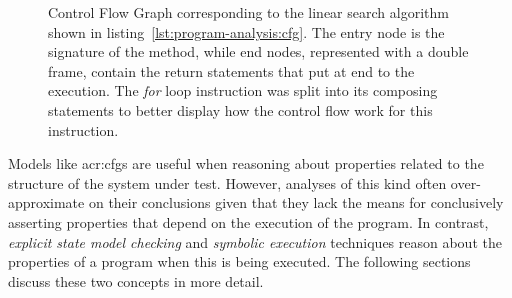 \begin{figure}[t]
\centering
{}
\caption[Control Flow Graph of Linear Search Algorithm]{Control Flow Graph corresponding to the linear search algorithm shown in listing~\ref{lst:program-analysis:cfg}. The entry node is the signature of the method, while end nodes, represented with a double frame, contain the return statements that put at end to the execution. The \textit{for} loop instruction was split into its composing statements to better display how the control flow work for this instruction.}
\label{fig:program-analysis:cfg}
\end{figure}

Models like \acrshort{acr:cfg}s are useful when reasoning about properties related to the structure of the system under test. However, analyses of this kind often over-approximate on their conclusions given that they lack the means for conclusively asserting properties that depend on the execution of the program. In contrast, \textit{explicit state model checking} and \textit{symbolic execution} techniques reason about the properties of a program when this is being executed. The following sections discuss these two concepts in more detail.


